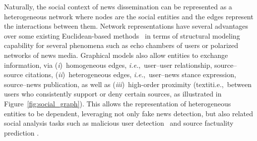 \documentclass[sigconf,anonymous]{acmart}
\theoremstyle{definition}
\theoremstyle{hypothesis}
\begin{document}
Naturally, the social context of news dissemination can be represented as a heterogeneous network where nodes are the social entities and the edges represent the interactions between them. Network representations have several advantages over some existing Euclidean-based methods~\cite{ruchansky2017csi,liu2018early} in terms of structural modeling capability for several phenomena such as
echo chambers of users or polarized networks of news media. Graphical models also allow entities to exchange information, via (\emph{i})~homogeneous edges, \textit{i.e.},~user--user relationship, source--source citations, (\emph{ii})~heterogeneous edges, \textit{i.e.},~user--news stance expression, source--news publication, as well as (\emph{iii})~high-order proximity (textit{i.e.},~between users who consistently support or deny certain sources, as illustrated in Figure~\ref{fig:social_graph}). This allows the representation of heterogeneous entities to be dependent, leveraging not only fake news detection, but also related social analysis tasks such as malicious user detection~\cite{SeminarUsers2017} and source factuality prediction \cite{baly2018predicting}.




\end{document}
